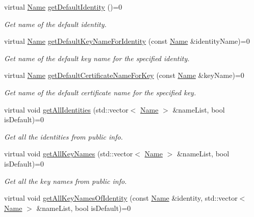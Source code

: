\begin{DoxyCompactItemize}
virtual \hyperlink{classndn_1_1Name}{Name} \hyperlink{classndn_1_1SecPublicInfo_a2d8c6fbf21be9d52dc875212528c1ffa}{get\+Default\+Identity} ()=0
\begin{DoxyCompactList}\small\item\em Get name of the default identity. \end{DoxyCompactList}\item 
virtual \hyperlink{classndn_1_1Name}{Name} \hyperlink{classndn_1_1SecPublicInfo_a07799ff9834b7348306fb3a6533a3812}{get\+Default\+Key\+Name\+For\+Identity} (const \hyperlink{classndn_1_1Name}{Name} \&identity\+Name)=0
\begin{DoxyCompactList}\small\item\em Get name of the default key name for the specified identity. \end{DoxyCompactList}\item 
virtual \hyperlink{classndn_1_1Name}{Name} \hyperlink{classndn_1_1SecPublicInfo_ad12cfa2f72271f1c44e02b2969c8fad1}{get\+Default\+Certificate\+Name\+For\+Key} (const \hyperlink{classndn_1_1Name}{Name} \&key\+Name)=0
\begin{DoxyCompactList}\small\item\em Get name of the default certificate name for the specified key. \end{DoxyCompactList}\item 
virtual void \hyperlink{classndn_1_1SecPublicInfo_a43fc02decde382bff2d72c00e3a6461e}{get\+All\+Identities} (std\+::vector$<$ \hyperlink{classndn_1_1Name}{Name} $>$ \&name\+List, bool is\+Default)=0
\begin{DoxyCompactList}\small\item\em Get all the identities from public info. \end{DoxyCompactList}\item 
virtual void \hyperlink{classndn_1_1SecPublicInfo_a0579019fd7c8944b504e97e48ba42cd2}{get\+All\+Key\+Names} (std\+::vector$<$ \hyperlink{classndn_1_1Name}{Name} $>$ \&name\+List, bool is\+Default)=0
\begin{DoxyCompactList}\small\item\em Get all the key names from public info. \end{DoxyCompactList}\item 
virtual void \hyperlink{classndn_1_1SecPublicInfo_a47fa88cc8e659a5b0d3be19db538b00c}{get\+All\+Key\+Names\+Of\+Identity} (const \hyperlink{classndn_1_1Name}{Name} \&identity, std\+::vector$<$ \hyperlink{classndn_1_1Name}{Name} $>$ \&name\+List, bool is\+Default)=0

\end{DoxyCompactItemize}
